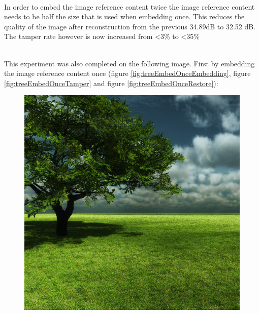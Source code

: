 \documentclass[12pt]{article}
\begin{document}
\hspace{0pt} \\
In order to embed the image reference content twice the image reference content needs to be half the size that is used when embedding once.
This reduces the quality of the image after reconstruction from the previous 34.89dB to 32.52 dB.
The tamper rate however is now increased from \textless 3\% to \textless 35\%

\hspace{0pt} \\
This experiment was also completed on the following image.
First by embedding the image reference content once (figure \ref{fig:treeEmbedOnceEmbedding}, figure \ref{fig:treeEmbedOnceTamper} and figure \ref{fig:treeEmbedOnceRestore}):

\begin{figure}[h]
\centerline{%
\includegraphics[scale=0.3375]{"tree"}%
\hspace{0.1cm}
}
\end{figure}
\end{document}
